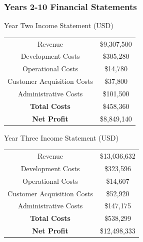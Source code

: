 \documentclass[12pt]{article}
\begin{document}
\subsubsection{Years 2-10 Financial Statements}
	
\begin{center}
	Year Two Income Statement (USD) \\[1.5ex]
	
	\begin{tabular}{c | c}
	Revenue & \$9,307,500  \\
	Development Costs & \$305,280 \\
	Operational Costs & \$14,780 \\
	Customer Acquisition Costs & \$37,800 \\
	Administrative Costs & \$101,500 \\
	\textbf{Total Costs} & \$458,360 \\
	\textbf{Net Profit} & \$8,849,140
	\end{tabular}
\end{center}
\vspace{1.5cm}
\pagebreak
\begin{center}
	Year Three Income Statement (USD) \\[1.5ex]
	
	\begin{tabular}{c | c}
	Revenue & \$13,036,632 \\
	Development Costs & \$323,596 \\
	Operational Costs & \$14,607 \\
	Customer Acquisition Costs & \$52,920 \\
	Administrative Costs & \$147,175 \\
	\textbf{Total Costs} & \$538,299 \\
	\textbf{Net Profit} & \$12,498,333
	\end{tabular}
\end{center}
\end{document}
